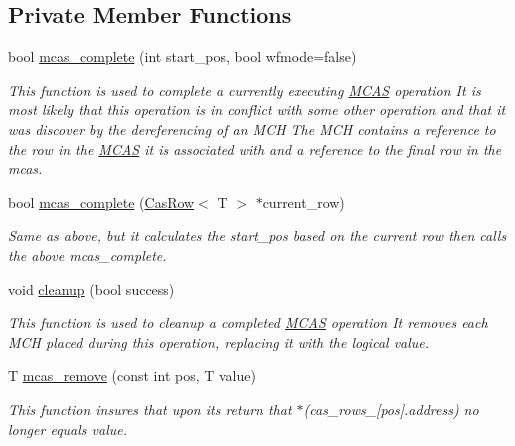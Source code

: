 \subsection*{Private Member Functions}
\begin{DoxyCompactItemize}
\item 
bool \hyperlink{classtervel_1_1algorithms_1_1wf_1_1mcas_1_1_multi_word_compare_and_swap_a3336555d8271a621a8d616197719de94}{mcas\+\_\+complete} (int start\+\_\+pos, bool wfmode=false)
\begin{DoxyCompactList}\small\item\em This function is used to complete a currently executing \hyperlink{classtervel_1_1algorithms_1_1wf_1_1mcas_1_1_m_c_a_s}{M\+C\+A\+S} operation It is most likely that this operation is in conflict with some other operation and that it was discover by the dereferencing of an M\+C\+H The M\+C\+H contains a reference to the row in the \hyperlink{classtervel_1_1algorithms_1_1wf_1_1mcas_1_1_m_c_a_s}{M\+C\+A\+S} it is associated with and a reference to the final row in the mcas. \end{DoxyCompactList}\item 
bool \hyperlink{classtervel_1_1algorithms_1_1wf_1_1mcas_1_1_multi_word_compare_and_swap_a7cfccaf9f649f972039aaae8634989ec}{mcas\+\_\+complete} (\hyperlink{classtervel_1_1algorithms_1_1wf_1_1mcas_1_1_cas_row}{Cas\+Row}$<$ T $>$ $\ast$current\+\_\+row)
\begin{DoxyCompactList}\small\item\em Same as above, but it calculates the start\+\_\+pos based on the current row then calls the above mcas\+\_\+complete. \end{DoxyCompactList}\item 
void \hyperlink{classtervel_1_1algorithms_1_1wf_1_1mcas_1_1_multi_word_compare_and_swap_a66dbc5cd0e815dd1884ae39e432ad44d}{cleanup} (bool success)
\begin{DoxyCompactList}\small\item\em This function is used to cleanup a completed \hyperlink{classtervel_1_1algorithms_1_1wf_1_1mcas_1_1_m_c_a_s}{M\+C\+A\+S} operation It removes each M\+C\+H placed during this operation, replacing it with the logical value. \end{DoxyCompactList}\item 
T \hyperlink{classtervel_1_1algorithms_1_1wf_1_1mcas_1_1_multi_word_compare_and_swap_a2bd338dc83ac629d5c139f74eab2f5d7}{mcas\+\_\+remove} (const int pos, T value)
\begin{DoxyCompactList}\small\item\em This function insures that upon its return that $\ast$(cas\+\_\+rows\+\_\+\mbox{[}pos\mbox{]}.address) no longer equals value. \end{DoxyCompactList}\end{DoxyCompactItemize}
